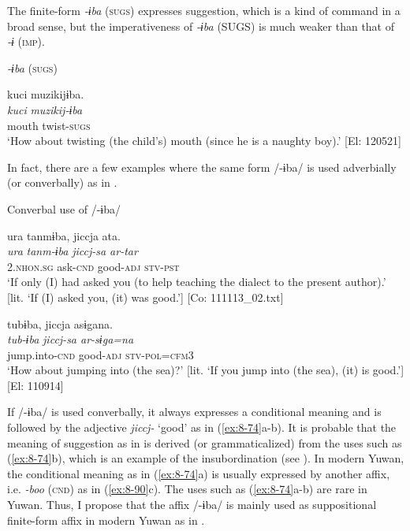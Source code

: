   The finite-form \textit{-ɨba} (\textsc{sugs}) expresses suggestion, which is a kind of command in a broad sense, but the imperativeness of \textit{-ɨba} (SUGS) is much weaker than that of \textit{-ɨ} (\textsc{imp}).

\ea\label{ex:8-73}
  \textit{-ɨba} (\textsc{sugs})

  {\TM}
\glll  kuci  muzikijɨba.\\
\textit{kuci}  \textit{muzikij-ɨba}\\
    mouth  twist-\textsc{sugs}\\
\glt ‘How about twisting (the child’s) mouth (since he is a naughty boy).’ [El: 120521]
\z

In fact, there are a few examples where the same form /-ɨba/ is used adverbially (or converbally) as in .

\ea\label{ex:8-74}
  Converbal use of /-ɨba/

\ea
{\TM}
\glll  ura  tanmɨba,  jiccja  ata.\\
\textit{ura}  \textit{tanm-ɨba}  \textit{jiccj-sa  ar-tar}\\
2.\textsc{nhon}.\textsc{sg}  ask-\textsc{cnd}  good-\textsc{adj}  \textsc{stv}-\textsc{pst}\\
\glt ‘If only (I) had asked you (to help teaching the dialect to the present author).’ [lit. ‘If (I) asked you, (it) was good.’]       [Co: 111113\_02.txt]

\ex
{\TM}
\glll  tubɨba,  jiccja  asɨgana.\\
\textit{tub-ɨba}  \textit{jiccj-sa  ar-sɨga=na}\\
jump.into-\textsc{cnd}  good-\textsc{adj}  \textsc{stv}-\textsc{pol}=\textsc{cfm3}\\
\glt ‘How about jumping into (the sea)?’ [lit. ‘If you jump into (the sea), (it) is good.’]       [El: 110914]
\z
\z

If /-ɨba/ is used converbally, it always expresses a conditional meaning and is followed by the adjective \textit{jiccj-} ‘good’ as in (\ref{ex:8-74}a-b). It is probable that the meaning of suggestion as in  is derived (or grammaticalized) from the uses such as (\ref{ex:8-74}b), which is an example of the insubordination (see ). In modern Yuwan, the conditional meaning as in (\ref{ex:8-74}a) is usually expressed by another affix, i.e. \textit{-boo} (\textsc{cnd}) as in (\ref{ex:8-90}c). The uses such as (\ref{ex:8-74}a-b) are rare in Yuwan. Thus, I propose that the affix /-ɨba/ is mainly used as suppositional finite-form affix in modern Yuwan as in .

